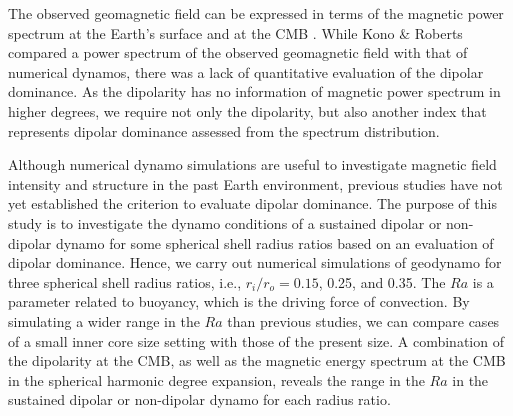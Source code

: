 The observed geomagnetic field can be expressed in terms of the magnetic power spectrum at the Earth’s surface \cite{Lowes:1974} and at the CMB \cite{Langel:1982}. 
While Kono \& Roberts  compared a power spectrum of the observed geomagnetic field with that of numerical dynamos, there was a lack of quantitative evaluation of the dipolar dominance. 
As the dipolarity has no information of magnetic power spectrum in higher degrees, we require not only the dipolarity, but also another index that represents dipolar dominance assessed from the spectrum distribution.

Although numerical dynamo simulations are useful to investigate magnetic field intensity and structure in the past Earth environment, previous studies have not yet established the criterion to evaluate dipolar dominance. 
The purpose of this study is to investigate the dynamo conditions of a sustained dipolar or non-dipolar dynamo for some spherical shell radius ratios based on an evaluation of dipolar dominance.
Hence, we carry out numerical simulations of geodynamo for three spherical shell radius ratios, i.e., $r_{i} / r_{o} = 0.15$, 0.25, and 0.35. 
The $Ra$ is a parameter related to buoyancy, which is the driving force of convection.
By simulating a wider range in the $Ra$ than previous studies, we can compare cases of a small inner core size setting with those of the present size. 
A combination of the dipolarity at the CMB, as well as the magnetic energy spectrum at the CMB in the spherical harmonic degree expansion, reveals the range in the $Ra$ in the sustained dipolar or non-dipolar dynamo for each radius ratio.
